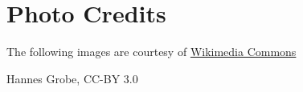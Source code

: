 \documentclass{ximera}
\begin{document}




\section*{Photo Credits}
The following images are courtesy of \href{https://commons.wikimedia.org/wiki/Main_Page}
{Wikimedia Commons}

\noindent Hannes Grobe,  CC-BY 3.0
\end{document}
